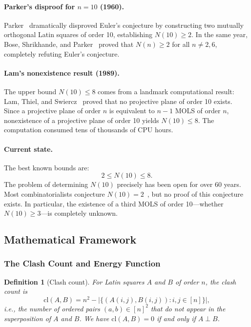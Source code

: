 \documentclass[11pt,a4paper]{article}
\newtheorem{definition}[theorem]{Definition}
\theoremstyle{remark}
\newcommand{\cl}{\mathrm{cl}}
\begin{document}
\paragraph{Parker's disproof for $n=10$ (1960).}
Parker~\cite{parker1960} dramatically disproved Euler's conjecture by constructing two
mutually orthogonal Latin squares of order 10, establishing $N(10) \geq 2$. In the same
year, Bose, Shrikhande, and Parker~\cite{bsp1960} proved that $N(n) \geq 2$ for all
$n \neq 2, 6$, completely refuting Euler's conjecture.

\paragraph{Lam's nonexistence result (1989).}
The upper bound $N(10) \leq 8$ comes from a landmark computational result: Lam, Thiel, and
Swiercz~\cite{lam1989} proved that no projective plane of order 10 exists. Since a
projective plane of order $n$ is equivalent to $n-1$ MOLS of order $n$, nonexistence of a
projective plane of order 10 yields $N(10) \leq 8$. The computation consumed tens of
thousands of CPU hours.

\paragraph{Current state.}
The best known bounds are:
\[
  2 \leq N(10) \leq 8.
\]
The problem of determining $N(10)$ precisely has been open for over 60 years. Most
combinatorialists conjecture $N(10) = 2$~\cite{colbourn2006,denes1991}, but no proof of
this conjecture exists. In particular, the existence of a third MOLS of order 10---whether
$N(10) \geq 3$---is completely unknown.

\subsection{Mathematical Framework}

\subsubsection{The Clash Count and Energy Function}

\begin{definition}[Clash count]
For Latin squares $A$ and $B$ of order $n$, the \emph{clash count} is
\[
  \cl(A, B) = n^2 - |\{(A(i,j), B(i,j)) : i,j \in [n]\}|,
\]
i.e., the number of ordered pairs $(a,b) \in [n]^2$ that do \emph{not} appear in the
superposition of $A$ and $B$. We have $\cl(A,B) = 0$ if and only if $A \perp B$.
\end{definition}
\end{document}
